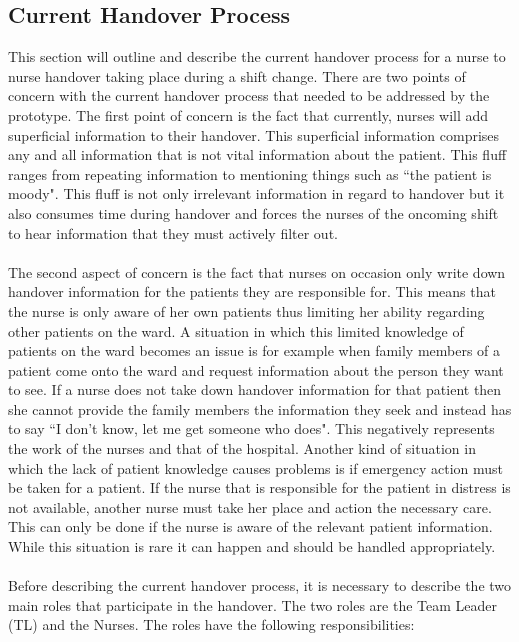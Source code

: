\subsection{Current Handover Process}
\label{Current Handover Process}
This section will outline and describe the current handover process for a nurse to nurse handover taking place during a shift change. There are two points of concern with the current handover process that needed to be addressed by the prototype. The first point of concern is the fact that currently, nurses will add superficial information to their handover. This superficial information comprises any and all information that is not vital information about the patient. This fluff ranges from repeating information to mentioning things such as ``the patient is moody". This fluff is not only irrelevant information in regard to handover but it also consumes time during handover and forces the nurses of the oncoming shift to hear information that they must actively filter out.
\\ \\
The second aspect of concern is the fact that nurses on occasion only write down handover information for the patients they are responsible for. This means that the nurse is only aware of her own patients thus limiting her ability regarding other patients on the ward. A situation in which this limited knowledge of patients on the ward becomes an issue is for example when family members of a patient come onto the ward and request information about the person they want to see. If a nurse does not take down handover information for that patient then she cannot provide the family members the information they seek and instead has to say ``I don't know, let me get someone who does". This negatively represents the work of the nurses and that of the hospital. Another kind of situation in which the lack of patient knowledge causes problems is if emergency action must be taken for a patient. If the nurse that is responsible for the patient in distress is not available, another nurse must take her place and action the necessary care. This can only be done if the nurse is aware of the relevant patient information. While this situation is rare it can happen and should be handled appropriately. 
\\ \\
Before describing the current handover process, it is necessary to describe the two main roles that participate in the handover. The two roles are the Team Leader (TL) and the Nurses. The roles have the following responsibilities: \\ \\

